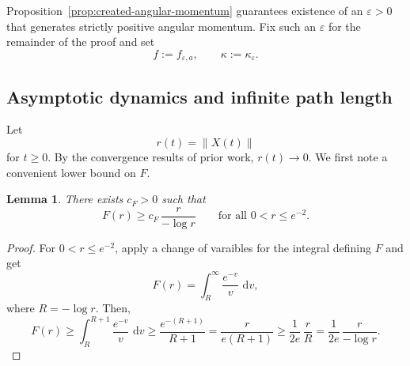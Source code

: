 \documentclass{article}
\newtheorem{lemma}[theorem]{Lemma}
\theoremstyle{remark}
\newcommand{\dd}{\,\mathrm{d}}
\begin{document}
Proposition~\ref{prop:created-angular-momentum} guarantees existence of an $\varepsilon>0$ that generates strictly positive angular momentum. Fix such an $\varepsilon$ for the remainder of the proof and set
\[
  f:=f_{\varepsilon,a},
  \qquad
  \kappa:=\kappa_\varepsilon.
\]


\subsection{Asymptotic dynamics and infinite path length}


Let
\[
   r(t)=\|X(t)\|
\]
for $t\ge 0$. By the convergence results of prior work, $r(t)\rightarrow 0$.
We first note a convenient lower bound on $F$.
\begin{lemma}\label{lem:lower-bound-F}
There exists $c_F>0$ such that
\[
  F(r)\ge c_F\,\frac{r}{-\log r}
  \qquad\text{for all }0<r\le e^{-2}.
\]
\end{lemma}

\begin{proof}
For $0<r\le e^{-2}$, apply a change of varaibles for the integral defining $F$ and get
\[
  F(r)=\int_R^\infty \frac{e^{-v}}{v}\,\dd v,
\]
where $R=-\log r$.
Then,
\[
  F(r)
  \ge \int_R^{R+1}\frac{e^{-v}}{v}\,\dd v
  \ge \frac{e^{-(R+1)}}{R+1}
  =\frac{r}{e(R+1)}
  \ge \frac{1}{2e}\,\frac{r}{R}
  =\frac{1}{2e}\,\frac{r}{-\log r}.
\]
\end{proof}



\end{document}
